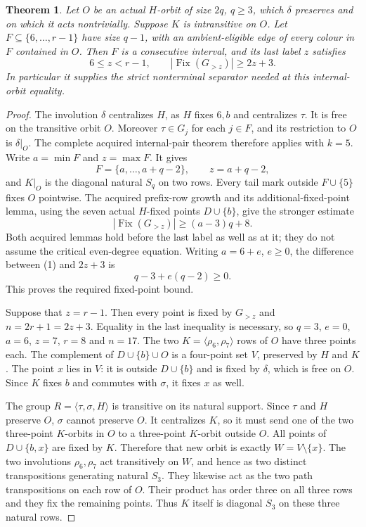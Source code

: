 \documentclass[11pt,a4paper]{article}
\newtheorem{theorem}{Theorem}
\newcommand{\gen}[1]{\langle#1\rangle}
\begin{document}
\begin{theorem}
Let $O$ be an actual $H$-orbit of size $2q$, $q\ge3$,
which $\delta$ preserves and on which it acts nontrivially. Suppose $K$ is
intransitive on $O$. Let $F\subseteq\{6,\ldots,r-1\}$
have size $q-1$, with an ambient-eligible edge of every
colour in $F$ contained in $O$. Then $F$ is a consecutive
interval, and its last label $z$ satisfies
\[
 6\le z<r-1,\qquad
                  |\operatorname{Fix}(G_{>z})|\ge2z+3.
\]
In particular it supplies the strict nonterminal separator
needed at this internal-orbit equality.
\end{theorem}
\begin{proof}
The involution $\delta$ centralizes $H$, as $H$ fixes
$6,b$ and centralizes $\tau$. It is free on the transitive
orbit $O$. Moreover $\tau\in G_j$ for each $j\in F$,
and its restriction to $O$ is $\delta|_O$.
The complete acquired internal-pair theorem therefore applies
with $k=5$. Write $a=\min F$ and $z=\max F$.
It gives
\[
 F=\{a,\ldots,a+q-2\},\qquad z=a+q-2,
\]
and $K|_O$ is the diagonal natural $S_q$ on two rows.
Every tail mark outside $F\cup\{5\}$ fixes $O$ pointwise.
The acquired prefix-row growth and its additional-fixed-point
lemma, using the seven actual $H$-fixed points $D\cup\{b\}$,
give the stronger estimate
\[
              |\operatorname{Fix}(G_{>z})|\ge(a-3)q+8.       \tag{1}
\]
Both acquired lemmas hold before the last label as well as
at it; they do not assume the critical even-degree equation.
Writing $a=6+e$, $e\ge0$, the difference between (1)
and $2z+3$ is
\[
                          q-3+e(q-2)\ge0.
\]
This proves the required fixed-point bound.

Suppose that $z=r-1$. Then every point is fixed by
$G_{>z}$ and $n=2r+1=2z+3$. Equality in the last inequality
is necessary, so $q=3$, $e=0$, $a=6$, $z=7$, $r=8$
and $n=17$. The two $K=\gen{\rho_6,\rho_7}$ rows
of $O$ have three points each. The complement of
$D\cup\{b\}\cup O$ is a four-point set $V$, preserved
by $H$ and $K$. The point $x$ lies in $V$: it is outside
$D\cup\{b\}$ and is fixed by $\delta$, which is free on
$O$. Since $K$ fixes $b$ and commutes with $\sigma$, it
fixes $x$ as well.

The group $R=\gen{\tau,\sigma,H}$ is transitive on its
natural support. Since $\tau$ and $H$ preserve $O$,
$\sigma$ cannot preserve $O$. It centralizes $K$, so it
must send one of the two three-point $K$-orbits in $O$
to a three-point $K$-orbit outside $O$. All points of
$D\cup\{b,x\}$ are fixed by $K$. Therefore that new
orbit is exactly $W=V\setminus\{x\}$.
The two involutions $\rho_6,\rho_7$ act transitively on
$W$, and hence as two distinct transpositions generating
natural $S_3$. They likewise act as the two path
transpositions on each row of $O$. Their product has order
three on all three rows and they fix the remaining points.
Thus $K$ itself is diagonal $S_3$ on these three natural rows.


\end{proof}
\end{document}
